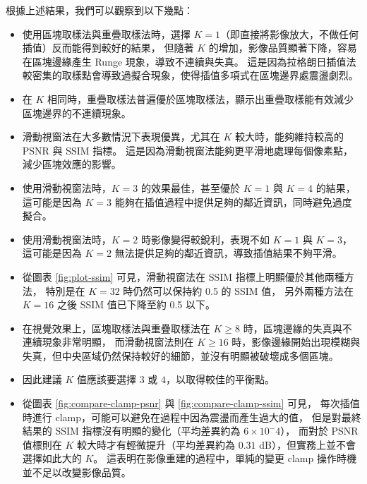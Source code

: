 \documentclass[a4paper,  10pt, oneside, fleqn]{article}
\begin{document}
根據上述結果，我們可以觀察到以下幾點：
\begin{itemize}
    \item 使用區塊取樣法與重疊取樣法時，選擇 $K = 1$（即直接將影像放大，不做任何插值）反而能得到較好的結果，
          但隨著 $K$ 的增加，影像品質顯著下降，容易在區塊邊緣產生 Runge 現象，導致不連續與失真。
          這是因為拉格朗日插值法較密集的取樣點會導致過擬合現象，使得插值多項式在區塊邊界處震盪劇烈。
    \item 在 $K$ 相同時，重疊取樣法普遍優於區塊取樣法，顯示出重疊取樣能有效減少區塊邊界的不連續現象。
    \item 滑動視窗法在大多數情況下表現優異，尤其在 $K$ 較大時，能夠維持較高的 PSNR 與 SSIM 指標。
          這是因為滑動視窗法能夠更平滑地處理每個像素點，減少區塊效應的影響。
    \item 使用滑動視窗法時，$K = 3$ 的效果最佳，甚至優於 $K = 1$ 與 $K = 4$ 的結果，
          這可能是因為 $K = 3$ 能夠在插值過程中提供足夠的鄰近資訊，同時避免過度擬合。
    \item 使用滑動視窗法時，$K = 2$ 時影像變得較銳利，表現不如 $K = 1$ 與 $K = 3$，
          這可能是因為 $K = 2$ 無法提供足夠的鄰近資訊，導致插值結果不夠平滑。
    \item 從圖表 \autoref{fig:plot-ssim} 可見，滑動視窗法在 SSIM 指標上明顯優於其他兩種方法，
          特別是在 $K = 32$ 時仍然可以保持約 0.5 的 SSIM 值，
          另外兩種方法在 $K = 16$ 之後 SSIM 值已下降至約 0.5 以下。
    \item 在視覺效果上，區塊取樣法與重疊取樣法在 $K \geq 8$ 時，區塊邊緣的失真與不連續現象非常明顯，
          而滑動視窗法則在 $K \geq 16$ 時，影像邊緣開始出現模糊與失真，但中央區域仍然保持較好的細節，並沒有明顯被破壞成多個區塊。
    \item 因此建議 $K$ 值應該要選擇 $3$ 或 $4$，以取得較佳的平衡點。
    \item 從圖表 \autoref{fig:compare-clamp-psnr} 與 \autoref{fig:compare-clamp-ssim} 可見，
          每次插值時進行 clamp，可能可以避免在過程中因為震盪而產生過大的值，
          但是對最終結果的 SSIM 指標沒有明顯的變化（平均差異約為 $6 \times 10^-4$），
          而對於 PSNR 值標則在 $K$ 較大時才有輕微提升（平均差異約為 $0.31$ dB），但實務上並不會選擇如此大的 $K$。
          這表明在影像重建的過程中，單純的變更 clamp 操作時機並不足以改變影像品質。
\end{itemize}
\end{document}
